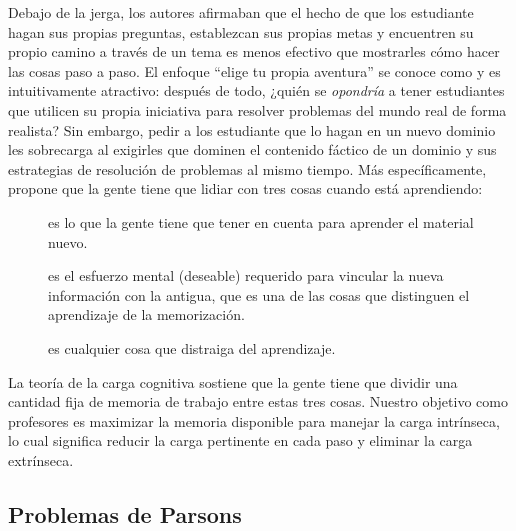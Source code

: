 Debajo de la jerga, 
los autores afirmaban que el hecho de que los estudiante hagan sus propias preguntas, 
establezcan sus propias metas y 
encuentren su propio camino a través de un tema es menos efectivo que mostrarles 
cómo hacer las cosas paso a paso. El enfoque ``elige tu propia aventura'' se conoce como  
y es intuitivamente atractivo: después de todo, 
¿quién se \emph{opondría} a tener estudiantes que utilicen su propia iniciativa 
para resolver problemas del mundo real de forma realista? 
Sin embargo, pedir a los estudiante que lo hagan en un nuevo dominio les sobrecarga 
al exigirles que dominen el contenido fáctico de un dominio y sus estrategias de resolución de problemas al mismo tiempo.
Más específicamente, 
 propone que 
la gente tiene que lidiar con tres cosas cuando está aprendiendo:


\begin{description}

\item[]
  es lo que la gente tiene que tener en cuenta para aprender el material nuevo.

\item[]
  es el esfuerzo mental (deseable) requerido para vincular la nueva información con la antigua, 
  que es una de las cosas que distinguen el aprendizaje de la memorización. 


\item[]
es cualquier cosa que distraiga del aprendizaje.

\end{description}

La teoría de la carga cognitiva sostiene que 
la gente tiene que dividir una cantidad fija de memoria de trabajo entre estas tres cosas. 
Nuestro objetivo como profesores es maximizar la memoria disponible para manejar la carga intrínseca, 
lo cual significa reducir la carga pertinente en cada paso y eliminar la carga extrínseca.


\subsection*{Problemas de Parsons} 

